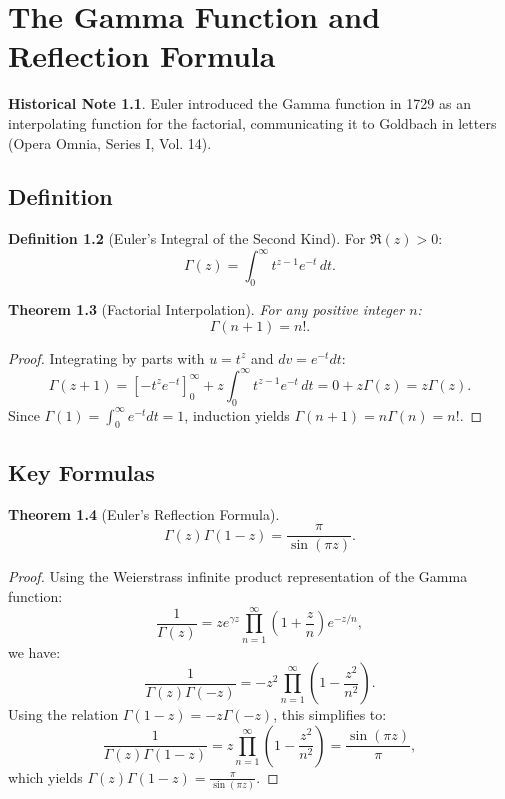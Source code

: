 \documentclass[11pt,a4paper,twoside]{book}
\theoremstyle{eulerstyle}
\newtheorem{theorem}{Theorem}[chapter]
\theoremstyle{definition}
\newtheorem{definition}[theorem]{Definition}
\newtheorem{historical}[theorem]{Historical Note}
\begin{document}
\cleardoublepage

\chapter{The Gamma Function and Reflection Formula}
\label{ch:gamma}

\begin{historical}
Euler introduced the Gamma function in 1729 as an interpolating function for the factorial, communicating it to Goldbach in letters (Opera Omnia, Series I, Vol. 14). \cite{euler1729}\end{historical}

\section{Definition}
\begin{definition}[Euler's Integral of the Second Kind]
For $\Re(z) > 0$:
\[
\Gamma(z) = \int_0^\infty t^{z-1} e^{-t}\, dt.
\]
\end{definition}

\begin{theorem}[Factorial Interpolation]
For any positive integer $n$:
\[
\Gamma(n+1) = n!.
\]
\end{theorem}
\begin{proof}
Integrating by parts with $u = t^z$ and $dv = e^{-t}dt$:
\[
\Gamma(z+1) = \left[ -t^z e^{-t} \right]_0^\infty + z \int_0^\infty t^{z-1} e^{-t}\, dt = 0 + z\Gamma(z) = z\Gamma(z).
\]
Since $\Gamma(1) = \int_0^\infty e^{-t}dt = 1$, induction yields $\Gamma(n+1) = n\Gamma(n) = n!$.
\end{proof}

\section{Key Formulas}
\begin{theorem}[Euler's Reflection Formula]
\[
\Gamma(z)\Gamma(1-z) = \frac{\pi}{\sin(\pi z)}.
\]
\end{theorem}
\begin{proof}
Using the Weierstrass infinite product representation of the Gamma function:
\[
\frac{1}{\Gamma(z)} = z e^{\gamma z} \prod_{n=1}^\infty \left(1 + \frac{z}{n}\right) e^{-z/n},
\]
we have:
\[
\frac{1}{\Gamma(z)\Gamma(-z)} = -z^2 \prod_{n=1}^\infty \left(1 - \frac{z^2}{n^2}\right).
\]
Using the relation $\Gamma(1-z) = -z\Gamma(-z)$, this simplifies to:
\[
\frac{1}{\Gamma(z)\Gamma(1-z)} = z \prod_{n=1}^\infty \left(1 - \frac{z^2}{n^2}\right) = \frac{\sin(\pi z)}{\pi},
\]
which yields $\Gamma(z)\Gamma(1-z) = \frac{\pi}{\sin(\pi z)}$.
\end{proof}
\end{document}
